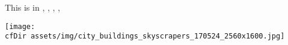 This is in \textbf{\currfilename},
\textbf{\currfiledir},
\textbf{\currfilepath},
\textbf{\currfileabsdir},
\textbf{\currfileabspath}
\par

\texttt{[image: \\cfDir assets/img/city\_buildings\_skyscrapers\_170524\_2560x1600.jpg]}
\par
